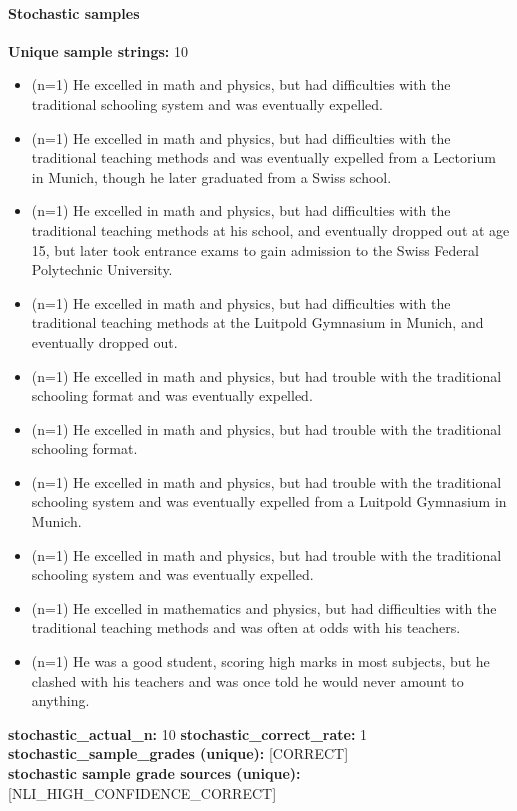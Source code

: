 \documentclass[11pt]{article}
\begin{document}
\paragraph{Stochastic samples}
\textbf{Unique sample strings:} 10\\
\small
\begin{itemize}
\item (n=1) He excelled in math and physics, but had difficulties with the traditional schooling system and was eventually expelled.
\item (n=1) He excelled in math and physics, but had difficulties with the traditional teaching methods and was eventually expelled from a Lectorium in Munich, though he later graduated from a Swiss school.
\item (n=1) He excelled in math and physics, but had difficulties with the traditional teaching methods at his school, and eventually dropped out at age 15, but later took entrance exams to gain admission to the Swiss Federal Polytechnic University.
\item (n=1) He excelled in math and physics, but had difficulties with the traditional teaching methods at the Luitpold Gymnasium in Munich, and eventually dropped out.
\item (n=1) He excelled in math and physics, but had trouble with the traditional schooling format and was eventually expelled.
\item (n=1) He excelled in math and physics, but had trouble with the traditional schooling format.
\item (n=1) He excelled in math and physics, but had trouble with the traditional schooling system and was eventually expelled from a Luitpold Gymnasium in Munich.
\item (n=1) He excelled in math and physics, but had trouble with the traditional schooling system and was eventually expelled.
\item (n=1) He excelled in mathematics and physics, but had difficulties with the traditional teaching methods and was often at odds with his teachers.
\item (n=1) He was a good student, scoring high marks in most subjects, but he clashed with his teachers and was once told he would never amount to anything.
\end{itemize}
\normalsize
\textbf{stochastic\_actual\_n:} 10 \quad \textbf{stochastic\_correct\_rate:} 1\\
\textbf{stochastic\_sample\_grades (unique):} [CORRECT]\\
\textbf{stochastic sample grade sources (unique):} [NLI\_HIGH\_CONFIDENCE\_CORRECT]\\
\end{document}
